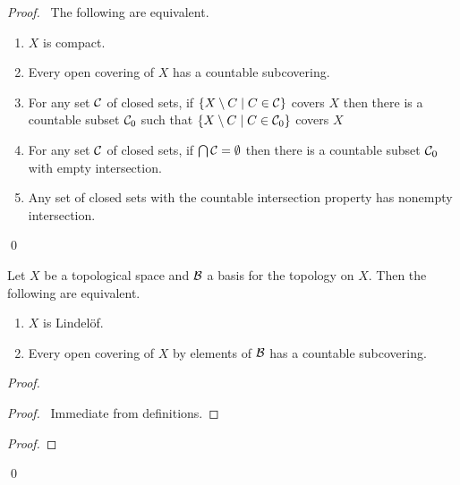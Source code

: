 \begin{proof}
    \pf\ The following are equivalent.
    \begin{enumerate}
        \item $X$ is compact.
        \item Every open covering of $X$ has a countable subcovering.
        \item For any set $\mathcal{C}$ of closed sets, if $\{ X \setminus C \mid C \in \mathcal{C} \}$ covers $X$ then there is a countable subset $\mathcal{C}_0$ such that
        $\{ X \setminus C \mid C \in \mathcal{C}_0 \}$ covers $X$
        \item For any set $\mathcal{C}$ of closed sets, if $\bigcap \mathcal{C} = \emptyset$ then there is a countable subset $\mathcal{C}_0$ with empty intersection.
        \item Any set of closed sets with the countable intersection property has nonempty intersection.
    \end{enumerate}
    \qed
\end{proof}

\begin{proposition}[CC]
    \label{proposition:lindelof_basis}
    Let $X$ be a topological space and $\mathcal{B}$ a basis for the topology on $X$.
    Then the following are equivalent.
    \begin{enumerate}
        \item $X$ is Lindel\"{o}f.
        \item Every open covering of $X$ by elements of $\mathcal{B}$ has a countable subcovering.
    \end{enumerate}
\end{proposition}

\begin{proof}
    \pf
    \begin{proof}
        \pf\ Immediate from definitions.
    \end{proof}
    \begin{proof}
    \end{proof}
    \qed
\end{proof}

